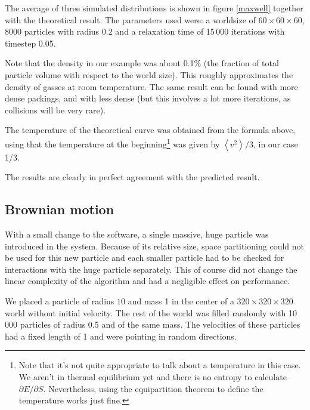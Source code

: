 The average of three simulated distributions is shown in figure \ref{maxwell} 
together with the theoretical result. The parameters used were: a worldsize of 
$60 \times 60 \times 60$, 8000 particles with radius 0.2 and a relaxation time 
of 15\,000 iterations with timestep 0.05.


Note that the density in our example was about 0.1\% (the fraction of total 
particle volume with respect to the world size). This roughly approximates 
the density of gasses at room temperature. The same result can be found 
with more dense packings, and with less dense (but this involves a lot more 
iterations, as collisions will be very rare).

The temperature of the theoretical curve was obtained from the formula 
above, using that the temperature at the beginning\footnote{Note that it's 
not quite appropriate to talk about a temperature in this case. We aren't 
in thermal equilibrium yet and there is no entropy to calculate $\partial E / 
\partial S$. Nevertheless, using the equipartition theorem to define the 
temperature works just fine.}
was given by $\left<v^2\right>/3$, in our case 1/3.

The results are clearly in perfect agreement with the predicted result.


\subsection{Brownian motion}
With a small change to the software, a single massive, huge particle was 
introduced in the system. Because of its relative size, space partitioning 
could not be used for this new particle and each smaller particle had to be 
checked for interactions with the huge particle separately. This of course 
did not change the linear complexity of the algorithm and had a negligible 
effect on performance.

We placed a particle of radius $10$ and mass 1 in the center of a $320 \times 
320 \times 320$ world without initial velocity. The rest of the world was 
filled randomly with 10\,000 particles of radius 0.5 and of the same mass. The 
velocities of these particles had a fixed length of 1 and
were pointing in random directions.

